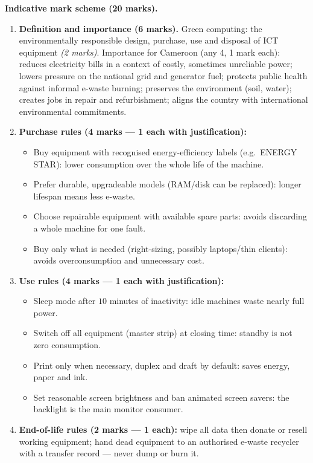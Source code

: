 \documentclass[11pt]{article}
\begin{document}
\begin{corrige}
\textbf{Indicative mark scheme (20 marks).}
\begin{enumerate}
\item \textbf{Definition and importance (6 marks).} Green computing: the environmentally responsible design, purchase, use and disposal of ICT equipment \emph{(2 marks)}. Importance for Cameroon (any 4, 1 mark each): reduces electricity bills in a context of costly, sometimes unreliable power; lowers pressure on the national grid and generator fuel; protects public health against informal e-waste burning; preserves the environment (soil, water); creates jobs in repair and refurbishment; aligns the country with international environmental commitments.
\item \textbf{Purchase rules (4 marks --- 1 each with justification):}
\begin{itemize}
\item Buy equipment with recognised energy-efficiency labels (e.g.\ ENERGY STAR): lower consumption over the whole life of the machine.
\item Prefer durable, upgradeable models (RAM/disk can be replaced): longer lifespan means less e-waste.
\item Choose repairable equipment with available spare parts: avoids discarding a whole machine for one fault.
\item Buy only what is needed (right-sizing, possibly laptops/thin clients): avoids overconsumption and unnecessary cost.
\end{itemize}
\item \textbf{Use rules (4 marks --- 1 each with justification):}
\begin{itemize}
\item Sleep mode after $10$ minutes of inactivity: idle machines waste nearly full power.
\item Switch off all equipment (master strip) at closing time: standby is not zero consumption.
\item Print only when necessary, duplex and draft by default: saves energy, paper and ink.
\item Set reasonable screen brightness and ban animated screen savers: the backlight is the main monitor consumer.
\end{itemize}
\item \textbf{End-of-life rules (2 marks --- 1 each):} wipe all data then donate or resell working equipment; hand dead equipment to an authorised e-waste recycler with a transfer record --- never dump or burn it.

\end{enumerate}
\end{corrige}
\end{document}
